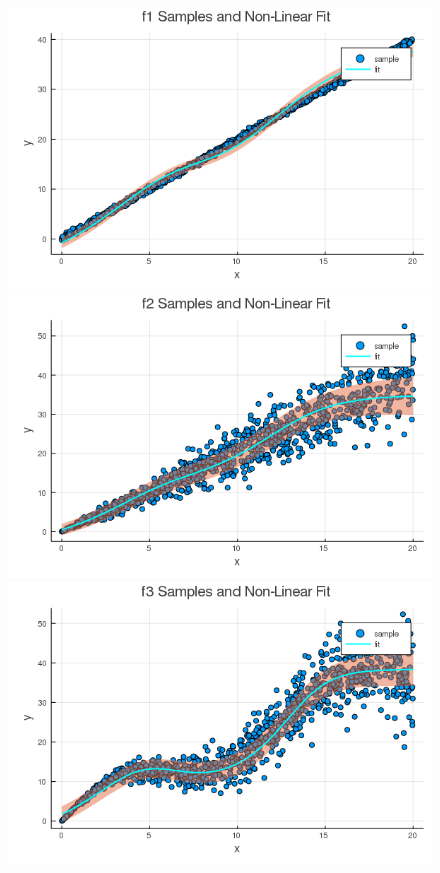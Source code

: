 \documentclass[12pt,letter]{article}
\begin{document}
\begin{enumerate}
\begin{figure}[h]
  \centering
  \includegraphics[width=12cm,keepaspectratio]{imgs/2_5_3_4_1.png}
  \includegraphics[width=12cm,keepaspectratio]{imgs/2_5_3_4_2.png}
  \includegraphics[width=12cm,keepaspectratio]{imgs/2_5_3_4_3.png}
\end{figure}
\end{enumerate}
\end{document}
